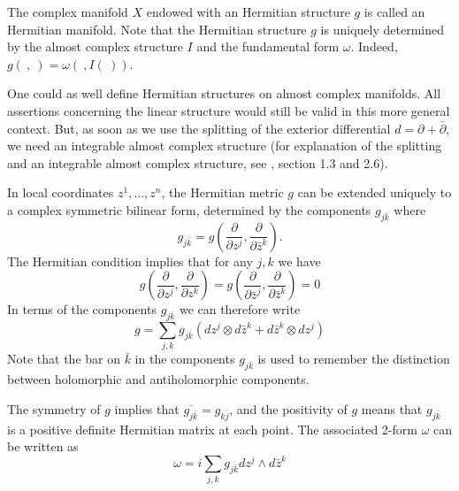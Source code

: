 \documentclass{ctexart}
\begin{document}
The complex manifold $X$ endowed with an Hermitian structure $g$ is called an Hermitian manifold. Note that the Hermitian structure $g$ is uniquely determined by 
the almost complex structure $I$ and the fundamental form $\omega$. Indeed, $g(\ ,\ )=\omega(\ , I(\ ))$.

One could as well define Hermitian structures on almost complex manifolds. All assertions concerning the linear structure would still be valid 
in this more general context. But, as soon as we use the splitting of the exterior differential $d=\partial+\bar{\partial}$, 
we need an integrable almost complex structure (for explanation of the splitting and an integrable almost complex structure, see \cite{Huybrechts2005}, section 1.3 and 2.6).

In local coordinates $z^1, \ldots, z^n$, the Hermitian metric $g$ can be extended uniquely 
to a complex symmetric bilinear form, determined by the components $g_{j \bar{k}}$ where
$$
g_{j \bar{k}}=g\left(\frac{\partial}{\partial z^j}, \frac{\partial}{\partial \bar{z}^k}\right).
$$
The Hermitian condition implies that for any $j, k$ we have
$$
g\left(\frac{\partial}{\partial z^j}, \frac{\partial}{\partial z^k}\right)=g\left(\frac{\partial}{\partial \bar{z}^j}, \frac{\partial}{\partial \bar{z}^k}\right)=0
$$
In terms of the components $g_{j \bar{k}}$ we can therefore write
$$
g=\sum_{j, k} g_{j \bar{k}}\left(d z^j \otimes d \bar{z}^k+d \bar{z}^k \otimes d z^j\right)
$$
Note that the bar on $\bar{k}$ in the components $g_{j \bar{k}}$ is used to remember the distinction between holomorphic and antiholomorphic components.

The symmetry of $g$ implies that $\overline{g_{j \bar{k}}}=g_{k \bar{j}}$, and the positivity of $g$ means that $g_{j \bar{k}}$ is a positive definite Hermitian matrix at each point. The associated 2-form $\omega$ can be written as
$$
\omega=i \sum_{j, k} g_{j \bar{k}} d z^j \wedge d \bar{z}^k
$$

\end{document}
